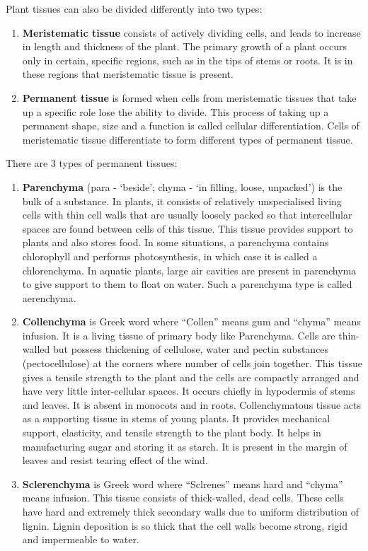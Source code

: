 \documentclass[]{book}
\providecommand{\tightlist}{%
  \setlength{\itemsep}{0pt}\setlength{\parskip}{0pt}}
\begin{document}
Plant tissues can also be divided differently into two types:

\begin{enumerate}
\def\labelenumi{\arabic{enumi}.}
\tightlist
\item
  \textbf{Meristematic tissue} consists of actively dividing cells, and leads to increase in length and thickness of the plant. The primary growth of a plant occurs only in certain, specific regions, such as in the tips of stems or roots. It is in these regions that meristematic tissue is present.
\item
  \textbf{Permanent tissue} is formed when cells from meristematic tissues that take up a specific role lose the ability to divide. This process of taking up a permanent shape, size and a function is called cellular differentiation. Cells of meristematic tissue differentiate to form different types of permanent tissue.
\end{enumerate}

There are 3 types of permanent tissues:

\begin{enumerate}
\def\labelenumi{\arabic{enumi}.}
\tightlist
\item
  \textbf{Parenchyma} (para - `beside'; chyma - `in filling, loose, unpacked') is the bulk of a substance. In plants, it consists of relatively unspecialised living cells with thin cell walls that are usually loosely packed so that intercellular spaces are found between cells of this tissue. This tissue provides support to plants and also stores food. In some situations, a parenchyma contains chlorophyll and performs photosynthesis, in which case it is called a chlorenchyma. In aquatic plants, large air cavities are present in parenchyma to give support to them to float on water. Such a parenchyma type is called aerenchyma.
\item
  \textbf{Collenchyma} is Greek word where ``Collen'' means gum and ``chyma'' means infusion. It is a living tissue of primary body like Parenchyma. Cells are thin-walled but possess thickening of cellulose, water and pectin substances (pectocellulose) at the corners where number of cells join together. This tissue gives a tensile strength to the plant and the cells are compactly arranged and have very little inter-cellular spaces. It occurs chiefly in hypodermis of stems and leaves. It is absent in monocots and in roots. Collenchymatous tissue acts as a supporting tissue in stems of young plants. It provides mechanical support, elasticity, and tensile strength to the plant body. It helps in manufacturing sugar and storing it as starch. It is present in the margin of leaves and resist tearing effect of the wind.
\item
  \textbf{Sclerenchyma} is Greek word where ``Sclrenes'' means hard and ``chyma'' means infusion. This tissue consists of thick-walled, dead cells. These cells have hard and extremely thick secondary walls due to uniform distribution of lignin. Lignin deposition is so thick that the cell walls become strong, rigid and impermeable to water.
\end{enumerate}
\end{document}
